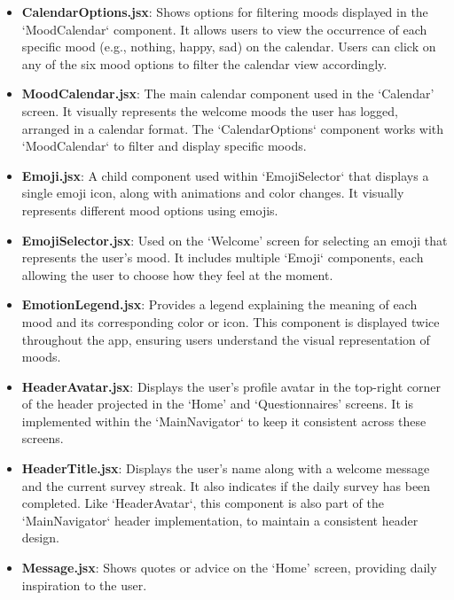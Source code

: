 \begin{itemize}
\begin{itemize}
        \item \textbf{CalendarOptions.jsx}: Shows options for filtering moods displayed in the `MoodCalendar` component. It allows users to view the occurrence of each specific mood (e.g., nothing, happy, sad) on the calendar. Users can click on any of the six mood options to filter the calendar view accordingly.
        
        \item \textbf{MoodCalendar.jsx}: The main calendar component used in the `Calendar' screen. It visually represents the welcome moods the user has logged, arranged in a calendar format. The `CalendarOptions` component works with `MoodCalendar` to filter and display specific moods.
        
        \item \textbf{Emoji.jsx}: A child component used within `EmojiSelector` that displays a single emoji icon, along with animations and color changes. It visually represents different mood options using emojis.
        
        \item \textbf{EmojiSelector.jsx}: Used on the `Welcome' screen for selecting an emoji that represents the user’s mood. It includes multiple `Emoji` components, each allowing the user to choose how they feel at the moment.
        
        \item \textbf{EmotionLegend.jsx}: Provides a legend explaining the meaning of each mood and its corresponding color or icon. This component is displayed twice throughout the app, ensuring users understand the visual representation of moods.
        
        \item \textbf{HeaderAvatar.jsx}: Displays the user’s profile avatar in the top-right corner of the header projected in the `Home' and `Questionnaires' screens. It is implemented within the `MainNavigator` to keep it consistent across these screens.
        
        \item \textbf{HeaderTitle.jsx}: Displays the user’s name along with a welcome message and the current survey streak. It also indicates if the daily survey has been completed. Like `HeaderAvatar`, this component is also part of the `MainNavigator` header implementation, to maintain a consistent header design.
        
        \item \textbf{Message.jsx}: Shows quotes or advice on the `Home' screen, providing daily inspiration to the user.
        

\end{itemize}
\end{itemize}
